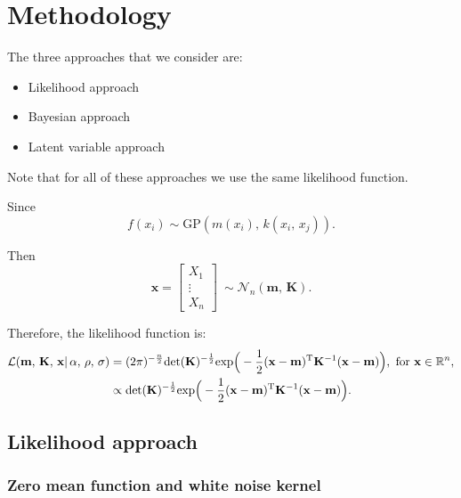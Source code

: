 \section{Methodology}

   The three approaches that we consider are:
   \begin{itemize}
      \item Likelihood approach
      \item Bayesian approach
      \item Latent variable approach
   \end{itemize}

   Note that for all of these approaches we use the same likelihood function.

   Since
   \[f(x_{i}) \sim \text{GP}(m(x_{i}) ,\, k(x_{i},\, x_{j})).\]

   Then
   \[\mathbf{x} =
   \begin{bmatrix}
      X_{1}\\ \vdots\\ X_{n}
   \end{bmatrix}
   \:
   \sim \mathcal{N}_{n}(\mathbf{m}, \, \mathbf{K}).\]

   Therefore, the likelihood function is:
   \begin{align*}
      \mathcal{L}(\mathbf{m} ,\, \mathbf{K} ,\, \mathbf{x}| \, \alpha ,\, \rho ,\, \sigma)
      & = (2\pi)^{-\frac{n}{2}}\text{det} (\mathbf{K})^{-\frac{1}{2}} 
      \text{exp} \Big(-\frac{1}{2} (\mathbf{x} - \mathbf{m})^{\text{\text{T}}} \mathbf{K}^{-1} (\mathbf{x} - \mathbf{m}) \Big),
      \text{ for } \mathbf{x} \in \mathbb{R}^{n},\\
      & \propto \text{det}(\mathbf{K})^{-\frac{1}{2}} 
      \text{exp} \Big(-\frac{1}{2} (\mathbf{x} - \mathbf{m})^{\text{\text{T}}} \mathbf{K}^{-1} (\mathbf{x} - \mathbf{m}) \Big).
   \end{align*}
   
   \subsection{Likelihood approach}

      \subsubsection{Zero mean function and white noise kernel}

